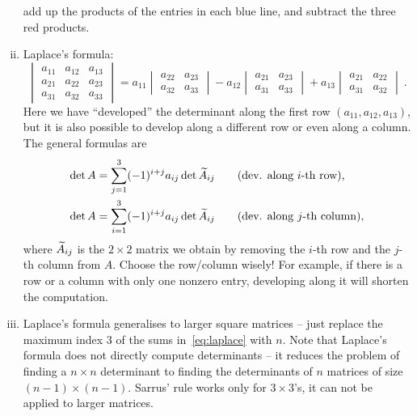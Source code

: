 \begin{remark}
\begin{enumerate}[(i)]
	add up the products of the entries in each blue line, and subtract the three red products.
	\item Laplace's formula:
	\[ \begin{vmatrix}
	a_{11} & a_{12} & a_{13} \\ a_{21} & a_{22} & a_{23} \\ a_{31} & a_{32} & a_{33}
	\end{vmatrix} = a_{11}\begin{vmatrix}
	a_{22} & a_{23} \\ a_{32} & a_{33}
	\end{vmatrix} - a_{12}\begin{vmatrix}
	a_{21} & a_{23} \\ a_{31} & a_{33}	
	\end{vmatrix} + a_{13}\begin{vmatrix}
	a_{21} & a_{22} \\ a_{31} & a_{32}
	\end{vmatrix} \:. \]
	Here we have ``developed'' the determinant along the first row $(a_{11},a_{12},a_{13})$, but it is also possible to develop along a different row or even along a column. The general formulas are
	\begin{equation}
	\label{eq:laplace}
	\begin{split}
	\det A & = \sum_{j=1}^3 (-1)^{i+j} a_{ij} \det \widetilde{A}_{ij}
	\qquad \text{(dev. along $i$-th row),} \\
	\det A & = \sum_{i=1}^3 (-1)^{i+j} a_{ij} \det \widetilde{A}_{ij} \qquad \text{(dev. along $j$-th column),}
	\end{split}
	\end{equation}
	where $\widetilde{A}_{ij}$ is the $2 \times 2$ matrix we obtain by removing the $i$-th row and the $j$-th column from $A$. Choose the row/column wisely! For example, if there is a row or a column with only one nonzero entry, developing along it will shorten the computation.
	\item Laplace's formula generalises to larger square matrices -- just replace the maximum index $3$ of the sums in~\eqref{eq:laplace} with $n$. Note that Laplace's formula does not directly compute determinants -- it reduces the problem of finding a $n \times n$ determinant to finding the determinants of $n$ matrices of size $(n-1) \times (n-1)$. Sarrus' rule works only for $3 \times 3$'s, it can not be applied to larger matrices.
\end{enumerate}
\end{remark}

